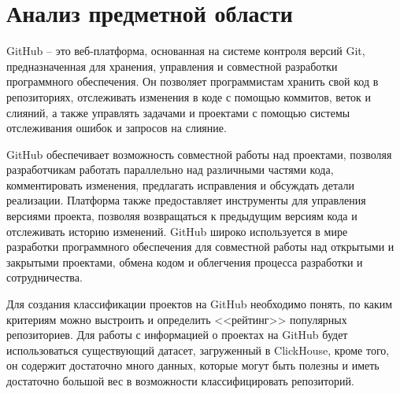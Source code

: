 \newpage
\section{Анализ предметной области}
\label{sec:Background}
GitHub -- это веб-платформа, основанная на системе контроля версий Git, предназначенная для хранения, управления и совместной разработки программного обеспечения. Он позволяет программистам хранить свой код в репозиториях, отслеживать изменения в коде с помощью коммитов, веток и слияний, а также управлять задачами и проектами с помощью системы отслеживания ошибок и запросов на слияние. 

GitHub обеспечивает возможность совместной работы над проектами, позволяя разработчикам работать параллельно над различными частями кода, комментировать изменения, предлагать исправления и обсуждать детали реализации. Платформа также предоставляет инструменты для управления версиями проекта, позволяя возвращаться к предыдущим версиям кода и отслеживать историю изменений. GitHub широко используется в мире разработки программного обеспечения для совместной работы над открытыми и закрытыми проектами, обмена кодом и облегчения процесса разработки и сотрудничества.

Для создания классификации проектов на GitHub необходимо понять, по каким критериям можно выстроить и определить <<рейтинг>> популярных репозиториев. Для работы с информацией о проектах на GitHub будет использоваться существующий датасет, загруженный в ClickHouse, кроме того, он содержит достаточно много данных, которые могут быть полезны и иметь достаточно большой вес в возможности классифицировать репозиторий. 
 
